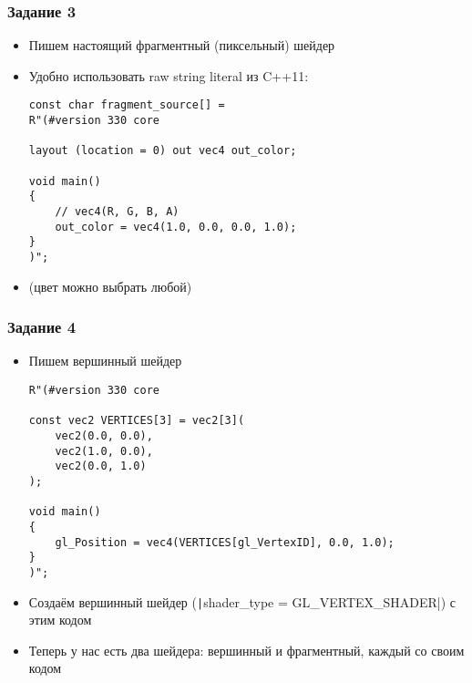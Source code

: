 \documentclass[10pt]{beamer}
\begin{document}
\begin{frame}[fragile]
\frametitle{Задание 3}
\begin{itemize}
\item Пишем настоящий фрагментный (пиксельный) шейдер
\item Удобно использовать raw string literal из C++11:
\begin{verbatim}
const char fragment_source[] =
R"(#version 330 core

layout (location = 0) out vec4 out_color;

void main()
{
    // vec4(R, G, B, A)
    out_color = vec4(1.0, 0.0, 0.0, 1.0);
}
)";
\end{verbatim}
\item (цвет можно выбрать любой)
\end{itemize}
\end{frame}

\begin{frame}[fragile]
\frametitle{Задание 4}
\begin{itemize}
\item Пишем вершинный шейдер
\begin{verbatim}
R"(#version 330 core

const vec2 VERTICES[3] = vec2[3](
    vec2(0.0, 0.0),
    vec2(1.0, 0.0),
    vec2(0.0, 1.0)
);

void main()
{
    gl_Position = vec4(VERTICES[gl_VertexID], 0.0, 1.0);
}
)";
\end{verbatim}
\item Создаём вершинный шейдер (\texttt|shader_type = GL_VERTEX_SHADER|) с этим кодом
\item Теперь у нас есть два шейдера: вершинный и фрагментный, каждый со своим кодом
\end{itemize}
\end{frame}
\end{document}
